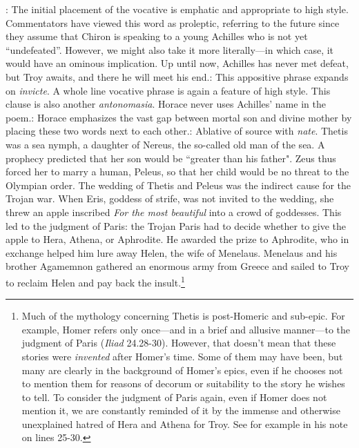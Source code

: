 : The initial placement of the vocative is emphatic and appropriate to high style.  Commentators have viewed this word as proleptic, referring to the future since they assume that Chiron is speaking to a young Achilles who is not yet ``undefeated''.  However, we might also take it more literally---in which case, it would have an ominous implication.  Up until now, Achilles has never met defeat, but Troy awaits, and there he will meet his end.\indent{}: This appositive phrase expands on \textit{invicte}.  A whole line vocative phrase is again a feature of high style.  This clause is also another \textit{antonomasia}.  Horace never uses Achilles' name in the poem.\indent{}: Horace emphasizes the vast gap between mortal son and divine mother by placing these two words next to each other.\indent{}: Ablative of source with \textit{nate}.  Thetis was a sea nymph, a daughter of Nereus, the so-called old man of the sea.   A prophecy predicted that her son would be ``greater than his father".  Zeus thus forced her to marry a human, Peleus, so that her child would be no threat to the Olympian order.  The wedding of Thetis and Peleus was the indirect cause for the Trojan war.  When Eris, goddess of strife, was not invited to the wedding, she threw an apple inscribed \textit{For the most beautiful} into a crowd of goddesses.  This led to the judgment of Paris: the Trojan Paris had to decide whether to give the apple to Hera, Athena, or Aphrodite.  He awarded the prize to Aphrodite, who in exchange helped him lure away Helen, the wife of Menelaus.  Menelaus and his brother Agamemnon gathered an enormous army from Greece and sailed to Troy to reclaim Helen and pay back the insult.\footnote{Much of the mythology concerning Thetis is post-Homeric and sub-epic.  For example, Homer refers only once---and in a brief and allusive manner---to the judgment of Paris (\textit{Iliad} 24.28-30).  However, that doesn't mean that these stories were \textit{invented} after Homer's time.  Some of them may have been, but many are clearly in the background of Homer's epics, even if he chooses not to mention them for reasons of decorum or suitability to the story he wishes to tell.  To consider the judgment of Paris again, even if Homer does not mention it, we are constantly reminded of it by the immense and otherwise unexplained hatred of Hera and Athena for Troy.  See for example \citet[88]{macleod1982} in his note on lines 25-30.}


